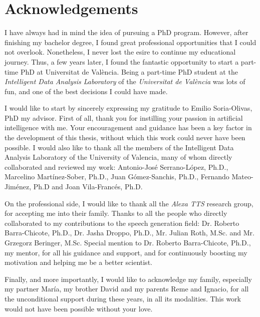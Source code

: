 \chapter*{Acknowledgements}

I have always had in mind the idea of pursuing a PhD program. However, after finishing my bachelor degree, I found great professional opportunities that I could not overlook. Nonetheless, I never lost the esire to continue my educational journey.  Thus, a  few years later, I found the fantastic opportunity to start a part-time PhD at Universitat de València. Being a part-time PhD student at the \textit{Intelligent Data Analysis Laboratory} of the \textit{Universitat de València} was lots of fun, and one of the best decisions I could have made.  

I would like to start by sincerely expressing my gratitude to Emilio Soria-Olivas, PhD my advisor. First of all, thank you for instilling your passion in artificial intelligence with me. Your encouragement and guidance has been a key factor in the development of this thesis, without which this work could never have been possible. I would also like to thank all the members of the Intelligent Data Analysis Laboratory of the University of Valencia, many of whom directly collaborated and reviewed my work: Antonio-José Serrano-López, Ph.D., Marcelino  Martínez-Sober, Ph.D., Juan Gómez-Sanchis, Ph.D., Fernando Mateo-Jiménez, Ph.D and Joan Vila-Francés, Ph.D. 

On the professional side, I would like to thank all the \textit{Alexa TTS} research group, for accepting me into their family. Thanks to all the people who directly collaborated to my contributions to the speech generation field: Dr. Roberto Barra-Chicote, Ph.D., Dr. Jasha Droppo, Ph.D., Mr. Julian Roth, M.Sc. and Mr. Grzegorz Beringer, M.Sc. Special mention to Dr. Roberto Barra-Chicote, Ph.D., my mentor, for all his guidance and support, and for continuously boosting my motivation and helping me be a better scientist.

Finally, and more importantly, I would like to acknowledge my family, especially my partner María, my brother David and my parents Reme and Ignacio, for all the unconditional support during these years, in all its modalities. This work would not have been possible without your love.

\clearpage
